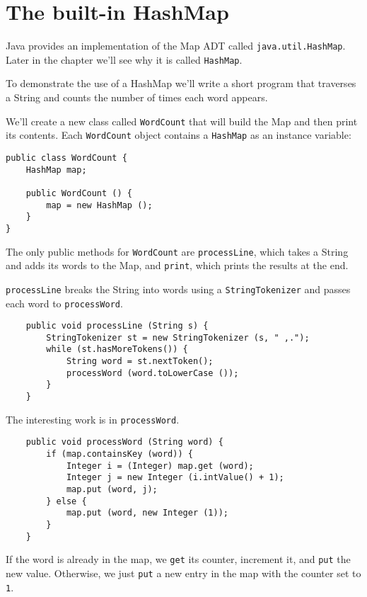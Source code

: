 \section {The built-in HashMap}

Java provides an implementation of the Map ADT called
{\tt java.util.HashMap}.
Later in the chapter we'll see why it is called {\tt HashMap}.

To demonstrate the use of a HashMap we'll write
a short program that traverses a String and counts the number
of times each word appears.

We'll create a new class called {\tt WordCount} that will
build the Map and then print its contents.  Each
{\tt WordCount} object contains a {\tt HashMap} as an
instance variable:

\begin{verbatim}
public class WordCount {
    HashMap map;

    public WordCount () {
        map = new HashMap ();
    }
}
\end{verbatim}
%
The only public methods for {\tt WordCount} are {\tt processLine},
which takes a String and adds its words to the Map, and {\tt print},
which prints the results at the end.

{\tt processLine} breaks the String into words using a 
{\tt StringTokenizer} and passes each word to {\tt processWord}.

\begin{verbatim}
    public void processLine (String s) {
        StringTokenizer st = new StringTokenizer (s, " ,.");
        while (st.hasMoreTokens()) {
            String word = st.nextToken();
            processWord (word.toLowerCase ());
        }
    }
\end{verbatim}
%
The interesting work is in {\tt processWord}.

\begin{verbatim}
    public void processWord (String word) {
        if (map.containsKey (word)) {
            Integer i = (Integer) map.get (word);
            Integer j = new Integer (i.intValue() + 1);
            map.put (word, j);
        } else {
            map.put (word, new Integer (1));
        }
    }
\end{verbatim}
%
If the word is already in the map, we {\tt get} its counter,
increment it, and {\tt put} the new value.  Otherwise, we just
{\tt put} a new entry in the map with the counter set to {\tt 1}.



